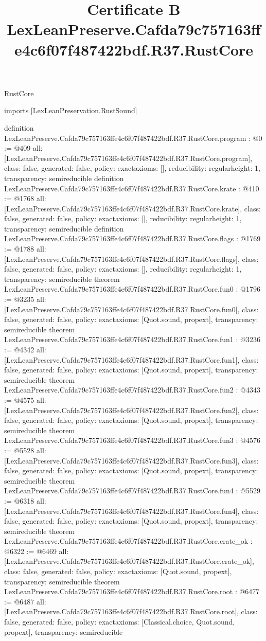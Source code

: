 \begin{lexlean}{RustCore}
\title{Certificate B LexLeanPreserve.Cafda79c757163ffe4c6f07f487422bdf.R37.RustCore}
\begin{coremodule}
imports [LexLeanPreservation.RustSound]

definition LexLeanPreserve.Cafda79c757163ffe4c6f07f487422bdf.R37.RustCore.program : @0 := @409 {
  all: [LexLeanPreserve.Cafda79c757163ffe4c6f07f487422bdf.R37.RustCore.program],
  class: false,
  generated: false,
  policy: exact{axioms: []},
  reducibility: regular{height: 1},
  transparency: semireducible
}
definition LexLeanPreserve.Cafda79c757163ffe4c6f07f487422bdf.R37.RustCore.krate : @410 := @1768 {
  all: [LexLeanPreserve.Cafda79c757163ffe4c6f07f487422bdf.R37.RustCore.krate],
  class: false,
  generated: false,
  policy: exact{axioms: []},
  reducibility: regular{height: 1},
  transparency: semireducible
}
definition LexLeanPreserve.Cafda79c757163ffe4c6f07f487422bdf.R37.RustCore.flags : @1769 := @1788 {
  all: [LexLeanPreserve.Cafda79c757163ffe4c6f07f487422bdf.R37.RustCore.flags],
  class: false,
  generated: false,
  policy: exact{axioms: []},
  reducibility: regular{height: 1},
  transparency: semireducible
}
theorem LexLeanPreserve.Cafda79c757163ffe4c6f07f487422bdf.R37.RustCore.fun0 : @1796 := @3235 {
  all: [LexLeanPreserve.Cafda79c757163ffe4c6f07f487422bdf.R37.RustCore.fun0],
  class: false,
  generated: false,
  policy: exact{axioms: [Quot.sound, propext]},
  transparency: semireducible
}
theorem LexLeanPreserve.Cafda79c757163ffe4c6f07f487422bdf.R37.RustCore.fun1 : @3236 := @4342 {
  all: [LexLeanPreserve.Cafda79c757163ffe4c6f07f487422bdf.R37.RustCore.fun1],
  class: false,
  generated: false,
  policy: exact{axioms: [Quot.sound, propext]},
  transparency: semireducible
}
theorem LexLeanPreserve.Cafda79c757163ffe4c6f07f487422bdf.R37.RustCore.fun2 : @4343 := @4575 {
  all: [LexLeanPreserve.Cafda79c757163ffe4c6f07f487422bdf.R37.RustCore.fun2],
  class: false,
  generated: false,
  policy: exact{axioms: [Quot.sound, propext]},
  transparency: semireducible
}
theorem LexLeanPreserve.Cafda79c757163ffe4c6f07f487422bdf.R37.RustCore.fun3 : @4576 := @5528 {
  all: [LexLeanPreserve.Cafda79c757163ffe4c6f07f487422bdf.R37.RustCore.fun3],
  class: false,
  generated: false,
  policy: exact{axioms: [Quot.sound, propext]},
  transparency: semireducible
}
theorem LexLeanPreserve.Cafda79c757163ffe4c6f07f487422bdf.R37.RustCore.fun4 : @5529 := @6318 {
  all: [LexLeanPreserve.Cafda79c757163ffe4c6f07f487422bdf.R37.RustCore.fun4],
  class: false,
  generated: false,
  policy: exact{axioms: [Quot.sound, propext]},
  transparency: semireducible
}
theorem LexLeanPreserve.Cafda79c757163ffe4c6f07f487422bdf.R37.RustCore.crate_ok : @6322 := @6469 {
  all: [LexLeanPreserve.Cafda79c757163ffe4c6f07f487422bdf.R37.RustCore.crate_ok],
  class: false,
  generated: false,
  policy: exact{axioms: [Quot.sound, propext]},
  transparency: semireducible
}
theorem LexLeanPreserve.Cafda79c757163ffe4c6f07f487422bdf.R37.RustCore.root : @6477 := @6487 {
  all: [LexLeanPreserve.Cafda79c757163ffe4c6f07f487422bdf.R37.RustCore.root],
  class: false,
  generated: false,
  policy: exact{axioms: [Classical.choice, Quot.sound, propext]},
  transparency: semireducible
}


\end{coremodule}
\end{lexlean}
